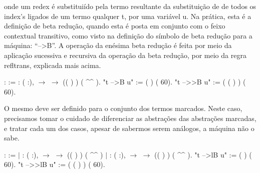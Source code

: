 onde um redex é substituiído pela termo resultante da substituição de de todos os index's ligados de um termo qualquer t, por uma variável
u. Na prática, esta é a definição de beta redução, quando esta é posta em conjunto com o feixo contextual transitivo, como visto na definição
do símbolo de beta redução para a máquina: ``-->B''. A operação da enésima beta redução é feita por meio da aplicação sucessiva e recursiva da
operação da beta redução, por meio da regra refltrans, explicada mais acima.\begin{coqdoccode}
\coqdocemptyline
\coqdocnoindent
{}  :    :=\coqdoceol
\coqdocindent{1.00em}
 : \coqdockw{\ensuremath{\forall}} ( :),   \ensuremath{\rightarrow}   \ensuremath{\rightarrow}\coqdoceol
\coqdocindent{2.00em}
 (( ) ) ( \^{}\^{} ).\coqdoceol
\coqdocnoindent
{} "t -->B u" := (   ) (  60).\coqdoceol
\coqdocnoindent
{} "t -->>B u" := ( ( )  ) (  60).\coqdoceol
\coqdocemptyline
\end{coqdoccode}
O mesmo deve ser definido para o conjunto dos termos marcados. Neste caso, precisamos tomar o cuidado de diferenciar as abstrações das
abstrações marcadas, e tratar cada um dos casos, apesar de sabermos serem análogos, a máquina não o sabe.\begin{coqdoccode}
\coqdocemptyline
\coqdocnoindent
{}  :    :=\coqdoceol
\coqdocindent{1.00em}
\ensuremath{|}  : \coqdockw{\ensuremath{\forall}} ( :),   \ensuremath{\rightarrow}   \ensuremath{\rightarrow}\coqdoceol
\coqdocindent{2.00em}
 (( ) ) ( \^{}\^{} )\coqdoceol
\coqdocindent{1.00em}
\ensuremath{|}  : \coqdockw{\ensuremath{\forall}} ( :),\coqdoceol
\coqdocindent{2.00em}
  \ensuremath{\rightarrow}   \ensuremath{\rightarrow}\coqdoceol
\coqdocindent{2.00em}
 (( ) ) ( \^{}\^{} ).\coqdoceol
\coqdocnoindent
{} "t -->lB u" := (   ) (  60).\coqdoceol
\coqdocnoindent
{} "t -->>lB u" := ( ( )  ) (  60).\coqdoceol
\coqdocemptyline
\end{coqdoccode}

